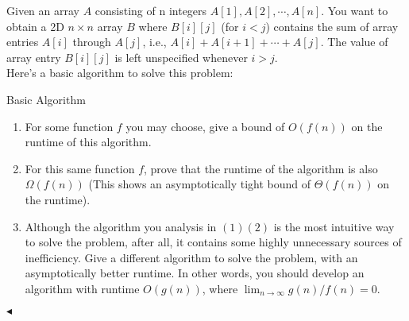 \documentclass[11pt]{article}
\newenvironment{problem}[2][Problem]{\begin{trivlist}
\item[\hskip \labelsep{\bfseries#1}\hskip\labelsep{\bfseries#2.}]}{\hfill$\blacktriangleleft$\end{trivlist}}
\begin{document}
\begin{problem}{6 (Partial Sum of a 1D Array)}
Given an array $A$ consisting of n integers $A[1],A[2],\cdots,A[n]$. 
You want to obtain a 2D $n \times  n$ array $B$ where $B[i][j]$ (for $i<j$) 
contains the sum of array entries $A[i]$ through $A[j]$, i.e., $A[i]+A[i+1]+\cdots+A[j]$. 
The value of array entry $B[i][j]$ is left unspecified whenever $i>j$.
\\Here's a basic algorithm to solve this problem:\\
\begin{algorithm}[H]
    \caption{Basic Algorithm}
\end{algorithm}
\begin{enumerate}[label = (\arabic*)]
    \item For some function $f$ you may choose, give a bound of $O(f(n))$ on the runtime of this algorithm.
    \item For this same function $f$, prove that the runtime of the algorithm is also $\Omega(f(n))$ (This shows an asymptotically 
    tight bound of $\Theta(f(n))$ on the runtime).
    \item Although the algorithm you analysis in $(1)(2)$ is the most intuitive way to solve the problem, after all, 
    it contains some highly unnecessary sources of inefficiency. Give a different algorithm to solve the problem, 
    with an asymptotically better runtime. In other words, you should develop an algorithm with runtime $O(g(n))$, 
    where $\lim_{n \rightarrow \infty} g(n)/f(n) = 0$.
    
\end{enumerate}
\end{problem}
\end{document}
